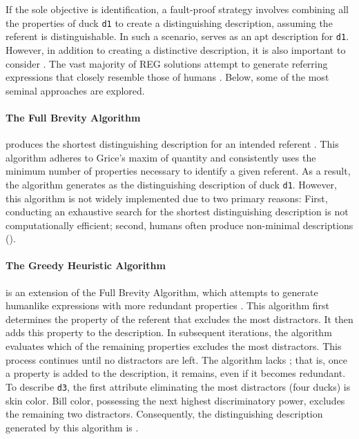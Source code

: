 If the sole objective is identification, a fault-proof strategy involves combining all the properties of duck \texttt{d1} to create a distinguishing description, assuming the referent is distinguishable. In such a scenario,  serves as an apt description for \texttt{d1}. However, in addition to creating a distinctive description, it is also important to consider . The vast majority of REG solutions attempt to generate referring expressions that closely resemble those of humans \citep{van2012toward,van2016computational}. Below, some of the most seminal approaches are explored.

\paragraph*{The Full Brevity Algorithm}
 produces the shortest distinguishing description for an intended referent \citep{dale1989cooking}. This algorithm adheres to Grice's maxim of quantity \citep{grice1975logic} and consistently uses the minimum number of properties necessary to identify a given referent. As a result, the algorithm generates  as the distinguishing description of duck \texttt{d1}. However, this algorithm is not widely implemented due to two primary reasons: First, conducting an exhaustive search for the shortest distinguishing description is not computationally efficient; second, humans often produce non-minimal descriptions (\citealt{comreg2019}).

\paragraph*{The Greedy Heuristic Algorithm}  is an extension of the Full Brevity Algorithm, which attempts to generate humanlike expressions with more redundant properties \citep{dale1989cooking}. This algorithm first determines the property of the referent that excludes the most distractors. It then adds this property to the description. In subsequent iterations, the algorithm evaluates which of the remaining properties excludes the most distractors. This process continues until no distractors are left. The algorithm lacks ; that is, once a property is added to the description, it remains, even if it becomes redundant. To describe \texttt{d3}, the first attribute eliminating the most distractors (four ducks) is skin color. Bill color, possessing the next highest discriminatory power, excludes the remaining two distractors. Consequently, the distinguishing description generated by this algorithm is .

